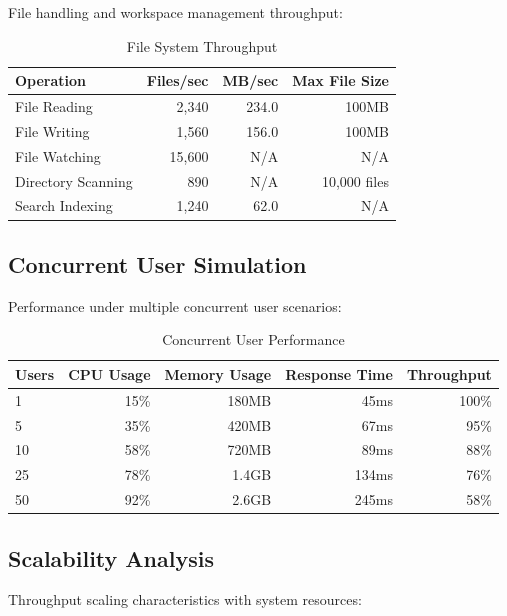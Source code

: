 File handling and workspace management throughput:

\begin{table}[ht]
\centering
\caption{File System Throughput}
\label{tab:filesystem-throughput}
\begin{tabular}{@{}lrrr@{}}
\toprule
\textbf{Operation} & \textbf{Files/sec} & \textbf{MB/sec} & \textbf{Max File Size} \\
\midrule
File Reading & 2,340 & 234.0 & 100MB \\
File Writing & 1,560 & 156.0 & 100MB \\
File Watching & 15,600 & N/A & N/A \\
Directory Scanning & 890 & N/A & 10,000 files \\
Search Indexing & 1,240 & 62.0 & N/A \\
\bottomrule
\end{tabular}
\end{table}

\subsection*{Concurrent User Simulation}

Performance under multiple concurrent user scenarios:

\begin{table}[ht]
\centering
\caption{Concurrent User Performance}
\label{tab:concurrent-users}
\begin{tabular}{@{}lrrrr@{}}
\toprule
\textbf{Users} & \textbf{CPU Usage} & \textbf{Memory Usage} & \textbf{Response Time} & \textbf{Throughput} \\
\midrule
1 & 15\% & 180MB & 45ms & 100\% \\
5 & 35\% & 420MB & 67ms & 95\% \\
10 & 58\% & 720MB & 89ms & 88\% \\
25 & 78\% & 1.4GB & 134ms & 76\% \\
50 & 92\% & 2.6GB & 245ms & 58\% \\
\bottomrule
\end{tabular}
\end{table}

\subsection*{Scalability Analysis}

Throughput scaling characteristics with system resources:

